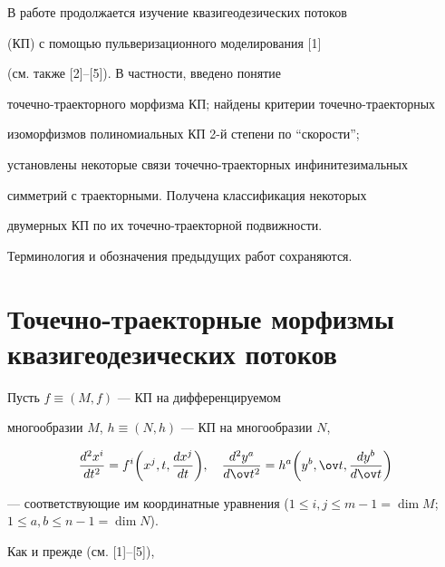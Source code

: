  




\maketitle 


\label{begin} 


 


В работе продолжается изучение квазигеодезических потоков 


(КП) с помощью пульверизационного моделирования [1] 


(см. также [2]--[5]). В частности, введено понятие 


точечно-траекторного морфизма КП; найдены критерии точечно-траекторных 


изоморфизмов полиномиальных КП 2-й степени по ``скорости''; 


установлены некоторые связи точечно-траекторных инфинитезимальных 


симметрий с траекторными. Получена классификация некоторых 


двумерных КП по их точечно-траекторной подвижности. 


Терминология и обозначения предыдущих работ сохраняются. 


 


\section{Точечно-траекторные морфизмы квазигеодезических потоков} 


 


Пусть $f\equiv(M,f)$ --- КП на дифференцируемом 


многообразии $M$, $h\equiv(N,h)$ --- КП на многообразии $N$, 


$$ 


\frac{d^2x^i}{dt^2}=f^i\bigg(x^j,t, 


\frac{dx^j}{dt}\bigg),\quad \frac{d^2y^a}{d\ov t^2}=h^a 


\bigg(y^b,\ov t,\frac{dy^b}{d\ov t} \bigg) 


$$ 


--- соответствующие им координатные уравнения ($1\le i,j\le m-1=\dim 


M$; $1\le a,b\le n-1=\dim N$). 


Как и прежде (см. [1]--[5]), 


